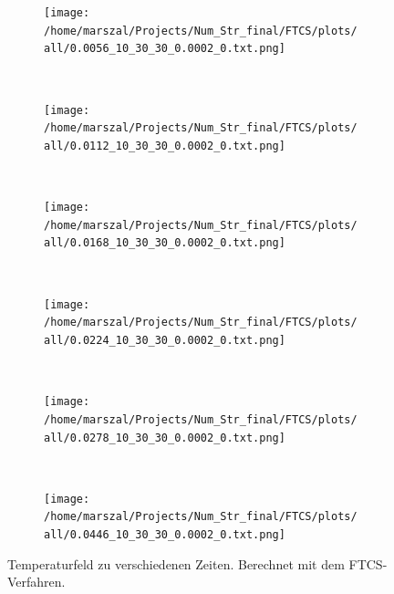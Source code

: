 \begin{figure}
\centering
  \begin{subfigure}[b]{0.48\textwidth}
    \texttt{[image: /home/marszal/Projects/Num\_Str\_final/FTCS/plots/all/0.0056\_10\_30\_30\_0.0002\_0.txt.png]}
  \end{subfigure}
  ~
  \begin{subfigure}[b]{0.48\textwidth}
    \texttt{[image: /home/marszal/Projects/Num\_Str\_final/FTCS/plots/all/0.0112\_10\_30\_30\_0.0002\_0.txt.png]}
  \end{subfigure}
  \\
  \begin{subfigure}[b]{0.48\textwidth}
    \texttt{[image: /home/marszal/Projects/Num\_Str\_final/FTCS/plots/all/0.0168\_10\_30\_30\_0.0002\_0.txt.png]}
  \end{subfigure}
  ~
  \begin{subfigure}[b]{0.48\textwidth}
    \texttt{[image: /home/marszal/Projects/Num\_Str\_final/FTCS/plots/all/0.0224\_10\_30\_30\_0.0002\_0.txt.png]}
  \end{subfigure}
  \\
  \begin{subfigure}[b]{0.48\textwidth}
    \texttt{[image: /home/marszal/Projects/Num\_Str\_final/FTCS/plots/all/0.0278\_10\_30\_30\_0.0002\_0.txt.png]}
  \end{subfigure}
  ~
  \begin{subfigure}[b]{0.48\textwidth}
    \texttt{[image: /home/marszal/Projects/Num\_Str\_final/FTCS/plots/all/0.0446\_10\_30\_30\_0.0002\_0.txt.png]}
  \end{subfigure}
\caption{Temperaturfeld zu verschiedenen Zeiten. Berechnet mit dem FTCS-Verfahren.}\label{fig:FTCSnaive}
\end{figure}
